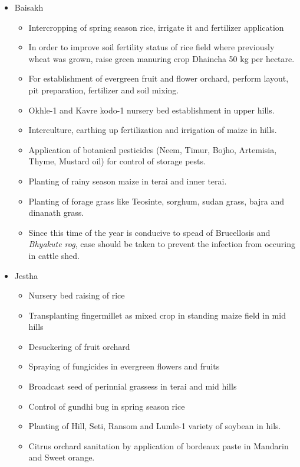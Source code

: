 \documentclass[
  openany]{book}
\providecommand{\tightlist}{%
  \setlength{\itemsep}{0pt}\setlength{\parskip}{0pt}}
\begin{document}
\begin{itemize}
\item
  Baisakh

  \begin{itemize}
  \tightlist
  \item
    Intercropping of spring season rice, irrigate it and fertilizer application
  \item
    In order to improve soil fertility status of rice field where previously wheat was grown, raise green manuring crop Dhaincha 50 kg per hectare.
  \item
    For establishment of evergreen fruit and flower orchard, perform layout, pit preparation, fertilizer and soil mixing.
  \item
    Okhle-1 and Kavre kodo-1 nursery bed establishment in upper hills.
  \item
    Interculture, earthing up fertilization and irrigation of maize in hills.
  \item
    Application of botanical pesticides (Neem, Timur, Bojho, Artemisia, Thyme, Mustard oil) for control of storage pests.
  \item
    Planting of rainy season maize in terai and inner terai.
  \item
    Planting of forage grass like Teosinte, sorghum, sudan grass, bajra and dinanath grass.
  \item
    Since this time of the year is conducive to spead of Brucellosis and \emph{Bhyakute rog}, case should be taken to prevent the infection from occuring in cattle shed.
  \end{itemize}
\item
  Jestha

  \begin{itemize}
  \tightlist
  \item
    Nursery bed raising of rice
  \item
    Transplanting fingermillet as mixed crop in standing maize field in mid hills
  \item
    Desuckering of fruit orchard
  \item
    Spraying of fungicides in evergreen flowers and fruits
  \item
    Broadcast seed of perinnial grassess in terai and mid hills
  \item
    Control of gundhi bug in spring season rice
  \item
    Planting of Hill, Seti, Ransom and Lumle-1 variety of soybean in hils.
  \item
    Citrus orchard sanitation by application of bordeaux paste in Mandarin and Sweet orange.
  \end{itemize}
\end{itemize}
\end{document}

